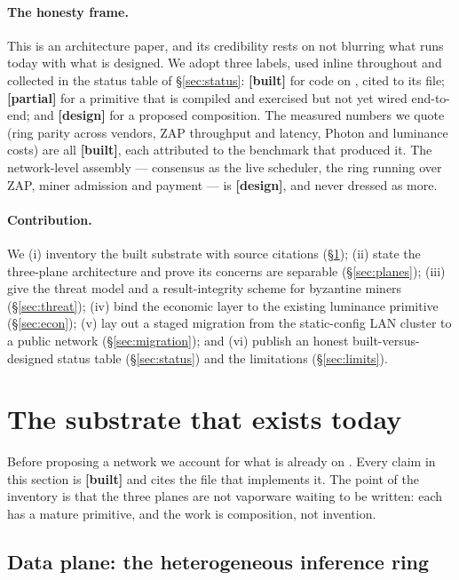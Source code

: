 \documentclass[11pt]{article}
\newcommand{\built}{\textcolor{str}{\small\textbf{[built]}}}
\newcommand{\partialb}{\textcolor{kw}{\small\textbf{[partial]}}}
\newcommand{\design}{\textcolor{cmt}{\small\textbf{[design]}}}
\begin{document}
\paragraph{The honesty frame.} This is an architecture paper, and its credibility rests on not
blurring what runs today with what is designed. We adopt three labels, used inline throughout
and collected in the status table of \S\ref{sec:status}: \built{} for code on ,
cited to its file; \partialb{} for a primitive that is compiled and exercised but not yet wired
end-to-end; and \design{} for a proposed composition. The measured numbers we quote (ring
parity across vendors, ZAP throughput and latency, Photon and luminance costs) are all \built{},
each attributed to the benchmark that produced it. The network-level assembly --- consensus as
the live scheduler, the ring running over ZAP, miner admission and payment --- is \design{},
and never dressed as more.

\paragraph{Contribution.} We (i) inventory the built substrate with source citations
(\S\ref{sec:today}); (ii) state the three-plane architecture and prove its concerns are
separable (\S\ref{sec:planes}); (iii) give the threat model and a result-integrity scheme for
byzantine miners (\S\ref{sec:threat}); (iv) bind the economic layer to the existing luminance
primitive (\S\ref{sec:econ}); (v) lay out a staged migration from the static-config LAN cluster
to a public network (\S\ref{sec:migration}); and (vi) publish an honest built-versus-designed
status table (\S\ref{sec:status}) and the limitations (\S\ref{sec:limits}).

\section{The substrate that exists today}
\label{sec:today}

Before proposing a network we account for what is already on . Every claim in this
section is \built{} and cites the file that implements it. The point of the inventory is that
the three planes are not vaporware waiting to be written: each has a mature primitive, and the
work is composition, not invention.

\subsection{Data plane: the heterogeneous inference ring}
\label{sec:ring}
\end{document}
